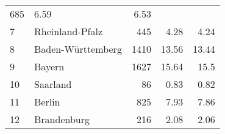 \begin{longtable}{lXrrr}
       \num{685} &
       \num[round-mode=places,round-precision=2]{6,59} &
         \num[round-mode=places,round-precision=2]{6,53} \\

     7 &
     \multicolumn{1}{X}{ Rheinland-Pfalz   } &


       \num{445} &
       \num[round-mode=places,round-precision=2]{4,28} &
         \num[round-mode=places,round-precision=2]{4,24} \\

     8 &
     \multicolumn{1}{X}{ Baden-Württemberg   } &


       \num{1410} &
       \num[round-mode=places,round-precision=2]{13,56} &
         \num[round-mode=places,round-precision=2]{13,44} \\

     9 &
     \multicolumn{1}{X}{ Bayern   } &


       \num{1627} &
       \num[round-mode=places,round-precision=2]{15,64} &
         \num[round-mode=places,round-precision=2]{15,5} \\

     10 &
     \multicolumn{1}{X}{ Saarland   } &


       \num{86} &
       \num[round-mode=places,round-precision=2]{0,83} &
         \num[round-mode=places,round-precision=2]{0,82} \\

     11 &
     \multicolumn{1}{X}{ Berlin   } &


       \num{825} &
       \num[round-mode=places,round-precision=2]{7,93} &
         \num[round-mode=places,round-precision=2]{7,86} \\

     12 &
     \multicolumn{1}{X}{ Brandenburg   } &


       \num{216} &
       \num[round-mode=places,round-precision=2]{2,08} &
         \num[round-mode=places,round-precision=2]{2,06} \\


\end{longtable}
